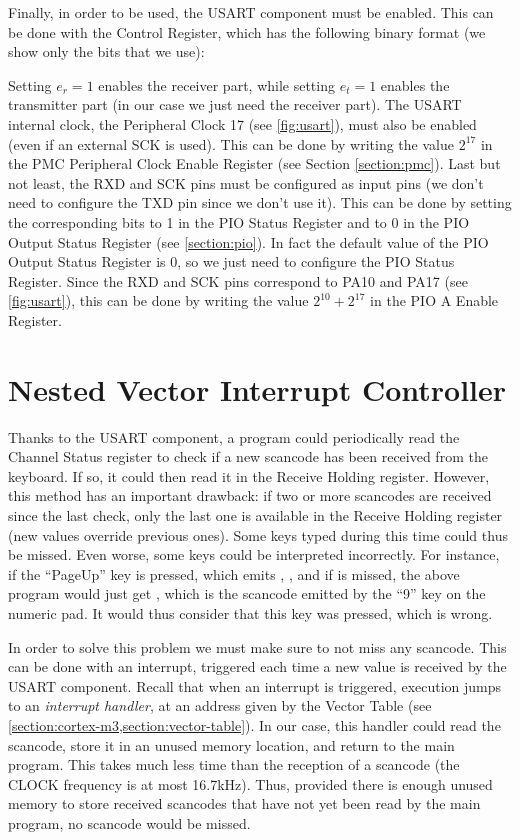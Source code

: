 Finally, in order to be used, the USART component must be enabled. This can be
done with the Control Register, which has the following binary format (we show
only the bits that we use):

\begin{flushright}
\end{flushright}

\noindent Setting $e_r=1$ enables the receiver part, while setting $e_t=1$
enables the transmitter part (in our case we just need the receiver part). The
USART internal clock, the Peripheral Clock 17 (see \cref{fig:usart}), must also
be enabled (even if an external SCK is used). This can be done by writing the
value $2^{17}$ in the PMC Peripheral Clock Enable Register (see Section
\cref{section:pmc}). Last but not least, the RXD and SCK pins must be
configured as input pins (we don't need to configure the TXD pin since we don't
use it). This can be done by setting the corresponding bits to 1 in the PIO
Status Register and to 0 in the PIO Output Status Register (see
\cref{section:pio}). In fact the default value of the PIO Output Status
Register is 0, so we just need to configure the PIO Status Register. Since the
RXD and SCK pins correspond to PA10 and PA17 (see \cref{fig:usart}), this can
be done by writing the value $2^{10}+2^{17}$ in the PIO A Enable Register.

\section{Nested Vector Interrupt Controller}\label{section:nvic}

Thanks to the USART component, a program could periodically read the Channel
Status register to check if a new scancode has been received from the keyboard.
If so, it could then read it in the Receive Holding register. However, this
method has an important drawback: if two or more scancodes are received since
the last check, only the last one is available in the Receive Holding register
(new values override previous ones). Some keys typed during this time could
thus be missed. Even worse, some keys could be interpreted incorrectly. For
instance, if the ``PageUp'' key is pressed, which emits , ,
and if  is missed, the above program would just get , which
is the scancode emitted by the ``9'' key on the numeric pad. It would thus
consider that this key was pressed, which is wrong.

In order to solve this problem we must make sure to not miss any scancode. This
can be done with an interrupt, triggered each time a new value is received by
the USART component. Recall that when an interrupt is triggered, execution
jumps to an {\em interrupt handler}, at an address given by the Vector Table
(see \cref{section:cortex-m3,section:vector-table}). In our case, this handler
could read the scancode, store it in an unused memory location, and return to
the main program. This takes much less time than the reception of a scancode
(the CLOCK frequency is at most 16.7kHz). Thus, provided there is enough
unused memory to store received scancodes that have not yet been read by the
main program, no scancode would be missed.

